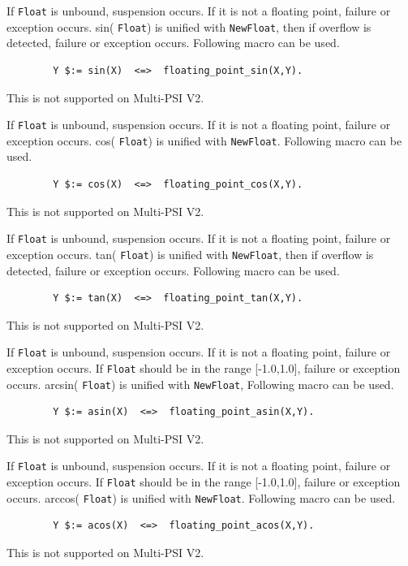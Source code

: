 \begin{itemize}
\index{\verb|**|}
If \verb|Float| is unbound, suspension occurs.
If it is not a floating point, failure or exception occurs.
sin( \verb|Float|) is unified with \verb|NewFloat|,
then if overflow is detected, failure or exception occurs.
Following macro can be used.
\begin{verbatim}
        Y $:= sin(X)  <=>  floating_point_sin(X,Y).
\end{verbatim}
\Caution This is not supported on Multi-PSI V2.

If \verb|Float| is unbound, suspension occurs.
If it is not a floating point, failure or exception occurs.
cos( \verb|Float|) is unified with \verb|NewFloat|.
Following macro can be used.
\begin{verbatim}
        Y $:= cos(X)  <=>  floating_point_cos(X,Y).
\end{verbatim}
\Caution This is not supported on Multi-PSI V2.

If \verb|Float| is unbound, suspension occurs.
If it is not a floating point, failure or exception occurs.
tan( \verb|Float|) is unified with \verb|NewFloat|,
then if overflow is detected, failure or exception occurs.
Following macro can be used.
\begin{verbatim}
        Y $:= tan(X)  <=>  floating_point_tan(X,Y).
\end{verbatim}
\Caution This is not supported on Multi-PSI V2.

If \verb|Float| is unbound, suspension occurs.
If it is not a floating point, failure or exception occurs.
If \verb|Float| should be in the range [-1.0,1.0], 
failure or exception occurs.
arcsin( \verb|Float|) is unified with \verb|NewFloat|,
Following macro can be used.
\begin{verbatim}
        Y $:= asin(X)  <=>  floating_point_asin(X,Y).
\end{verbatim}
\Caution This is not supported on Multi-PSI V2.

If \verb|Float| is unbound, suspension occurs.
If it is not a floating point, failure or exception occurs.
If \verb|Float| should be in the range [-1.0,1.0], 
failure or exception occurs.
arccos( \verb|Float|) is unified with \verb|NewFloat|.
Following macro can be used.
\begin{verbatim}
        Y $:= acos(X)  <=>  floating_point_acos(X,Y).
\end{verbatim}
\Caution This is not supported on Multi-PSI V2.


\end{itemize}
